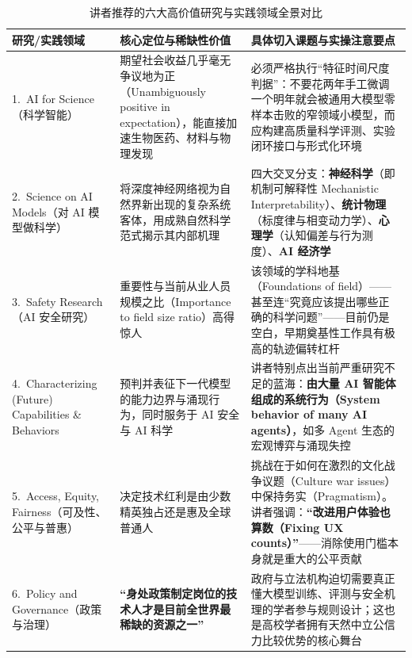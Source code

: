 \documentclass[a4paper]{article}
\begin{document}
\begin{table}[H]
\centering
\small
\caption{讲者推荐的六大高价值研究与实践领域全景对比}
\begin{tabular}{p{3.2cm}p{4.8cm}p{5.6cm}}
\toprule
\textbf{研究/实践领域} & \textbf{核心定位与稀缺性价值} & \textbf{具体切入课题与实操注意要点} \\
\midrule
1.\ AI for Science\newline（科学智能） & 期望社会收益几乎毫无争议地为正（Unambiguously positive in expectation），能直接加速生物医药、材料与物理发现 & 必须严格执行“特征时间尺度判据”：不要花两年手工微调一个明年就会被通用大模型零样本击败的窄领域小模型，而应构建高质量科学评测、实验闭环接口与形式化环境 \\
2.\ Science on AI Models\newline（对 AI 模型做科学） & 将深度神经网络视为自然界新出现的复杂系统客体，用成熟自然科学范式揭示其内部机理 & 四大交叉分支：\textbf{神经科学}（即机制可解释性 Mechanistic Interpretability）、\textbf{统计物理}（标度律与相变动力学）、\textbf{心理学}（认知偏差与行为测度）、\textbf{AI 经济学} \\
3.\ Safety Research\newline（AI 安全研究） & 重要性与当前从业人员规模之比（Importance to field size ratio）高得惊人 & 该领域的学科地基（Foundations of field）——甚至连“究竟应该提出哪些正确的科学问题”——目前仍是空白，早期奠基性工作具有极高的轨迹偏转杠杆 \\
4.\ Characterizing (Future) Capabilities \& Behaviors & 预判并表征下一代模型的能力边界与涌现行为，同时服务于 AI 安全与 AI 科学 & 讲者特别点出当前严重研究不足的蓝海：\textbf{由大量 AI 智能体组成的系统行为（System behavior of many AI agents）}，如多 Agent 生态的宏观博弈与涌现失控 \\
5.\ Access, Equity, Fairness\newline（可及性、公平与普惠） & 决定技术红利是由少数精英独占还是惠及全球普通人 & 挑战在于如何在激烈的文化战争议题（Culture war issues）中保持务实（Pragmatism）。讲者强调：\textbf{“改进用户体验也算数（Fixing UX counts）”}——消除使用门槛本身就是重大的公平贡献 \\
6.\ Policy and Governance\newline（政策与治理） & \textbf{“身处政策制定岗位的技术人才是目前全世界最稀缺的资源之一”} & 政府与立法机构迫切需要真正懂大模型训练、评测与安全机理的学者参与规则设计；这也是高校学者拥有天然中立公信力比较优势的核心舞台 \\
\bottomrule
\end{tabular}
\end{table}
\end{document}
